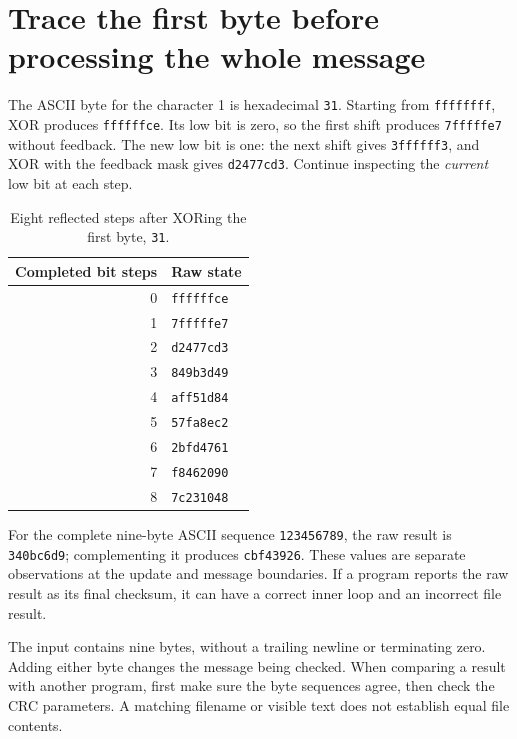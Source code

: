 \section{Trace the first byte before processing the whole message}
The ASCII byte for the character 1 is hexadecimal \texttt{31}. Starting from
\texttt{ffffffff}, XOR produces \texttt{ffffffce}. Its low bit is zero, so the
first shift produces \texttt{7fffffe7} without feedback. The new low bit is one:
the next shift gives \texttt{3ffffff3}, and XOR with the feedback mask gives
\texttt{d2477cd3}. Continue inspecting the \emph{current} low bit at each step.

\begin{table}[htbp]
  \centering
  \caption{Eight reflected steps after XORing the first byte, \texttt{31}.}
  \begin{tabular}{rl}
    \toprule
    Completed bit steps & Raw state         \\
    \midrule
    0                   & \texttt{ffffffce} \\
    1                   & \texttt{7fffffe7} \\
    2                   & \texttt{d2477cd3} \\
    3                   & \texttt{849b3d49} \\
    4                   & \texttt{aff51d84} \\
    5                   & \texttt{57fa8ec2} \\
    6                   & \texttt{2bfd4761} \\
    7                   & \texttt{f8462090} \\
    8                   & \texttt{7c231048} \\
    \bottomrule
  \end{tabular}
\end{table}

For the complete nine-byte ASCII sequence \texttt{123456789}, the raw result is
\texttt{340bc6d9}; complementing it produces \texttt{cbf43926}. These values are
separate observations at the update and message boundaries. If a program reports the
raw result as its final checksum, it can have a correct inner loop and an incorrect
file result.

The input contains nine bytes, without a trailing newline or terminating zero. Adding
either byte changes the message being checked. When comparing a result with another
program, first make sure the byte sequences agree, then check the CRC parameters.
A matching filename or visible text does not establish equal file contents.
